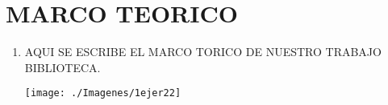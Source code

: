 \section{MARCO TEORICO} 

\begin{enumerate}[1.]
	\item AQUI SE ESCRIBE EL MARCO TORICO DE NUESTRO TRABAJO BIBLIOTECA.
    


	\begin{center}
	\texttt{[image: ./Imagenes/1ejer22]} 
	\end{center}

\end{enumerate} 